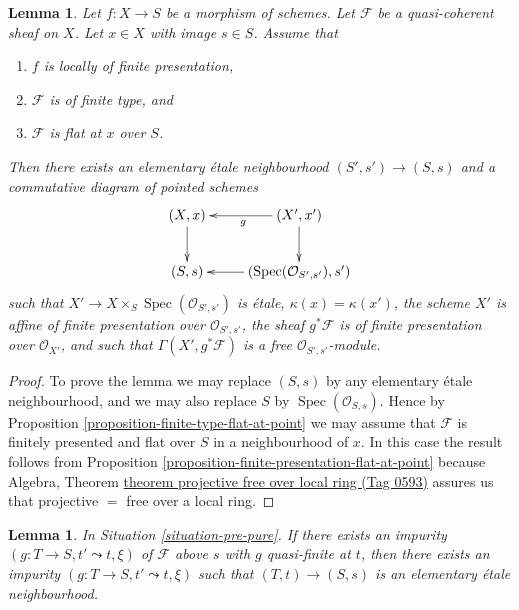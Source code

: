 \documentclass{amsart}
\theoremstyle{plain}
\newtheorem{lemma}[subsection]{Lemma}
\theoremstyle{definition}
\theoremstyle{remark}
\numberwithin{equation}{subsection}
\def\Spec{\mathop{\mathrm{Spec}}}
\begin{document}
\begin{lemma}
\label{lemma-finite-type-flat-at-point-free}
Let $f : X \to S$ be a morphism of schemes.
Let $\mathcal{F}$ be a quasi-coherent sheaf on $X$.
Let $x \in X$ with image $s \in S$.
Assume that
\begin{enumerate}
\item $f$ is locally of finite presentation,
\item $\mathcal{F}$ is of finite type, and
\item $\mathcal{F}$ is flat at $x$ over $S$.
\end{enumerate}
Then there exists an elementary \'etale neighbourhood $(S', s') \to (S, s)$
and a commutative diagram of pointed schemes
$$
\xymatrix{
(X, x) \ar[d] & (X', x') \ar[l]^g \ar[d] \\
(S, s) & (\Spec(\mathcal{O}_{S', s'}), s') \ar[l]
}
$$
such that $X' \to X \times_S \Spec(\mathcal{O}_{S', s'})$
is \'etale, $\kappa(x) = \kappa(x')$, the scheme $X'$ is
affine of finite presentation over $\mathcal{O}_{S', s'}$,
the sheaf $g^*\mathcal{F}$ is of finite presentation over $\mathcal{O}_{X'}$,
and such that $\Gamma(X', g^*\mathcal{F})$ is a free
$\mathcal{O}_{S', s'}$-module.
\end{lemma}

\begin{proof}
To prove the lemma we may replace $(S, s)$ by any elementary \'etale
neighbourhood, and we may also replace $S$ by
$\Spec(\mathcal{O}_{S, s})$. Hence by
Proposition \ref{proposition-finite-type-flat-at-point}
we may assume that $\mathcal{F}$ is finitely presented and flat over
$S$ in a neighbourhood of $x$. In this case the result follows from
Proposition \ref{proposition-finite-presentation-flat-at-point}
because
Algebra, Theorem \href{https://stacks.math.columbia.edu/tag/0593}{theorem projective free over local ring (Tag 0593)}
assures us that projective $=$ free over a local ring.
\end{proof}


\begin{lemma}
\label{lemma-quasi-finite-impurity-elementary}
In Situation \ref{situation-pre-pure}.
If there exists an impurity $(g : T \to S, t' \leadsto t, \xi)$
of $\mathcal{F}$ above $s$ with $g$ quasi-finite at $t$, then there
exists an impurity $(g : T \to S, t' \leadsto t, \xi)$ such that
$(T, t) \to (S, s)$ is an elementary \'etale neighbourhood.
\end{lemma}
\end{document}

